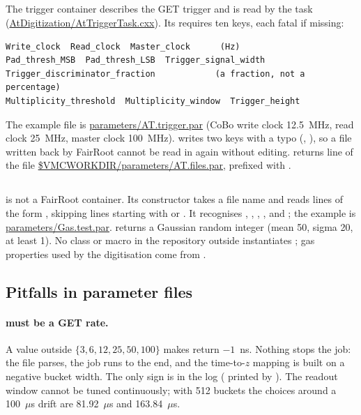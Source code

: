 \subsection{}

The trigger container  describes the GET trigger and is read by the task
 (\url{AtDigitization/AtTriggerTask.cxx}). Its  requires ten
 keys, each fatal if missing:
\begin{verbatim}
Write_clock  Read_clock  Master_clock      (Hz)
Pad_thresh_MSB  Pad_thresh_LSB  Trigger_signal_width
Trigger_discriminator_fraction            (a fraction, not a percentage)
Multiplicity_threshold  Multiplicity_window  Trigger_height
\end{verbatim}
The example file is
\url{parameters/AT.trigger.par} (CoBo write clock 12.5~MHz, read clock 25~MHz, master clock 100~MHz).
 writes two keys with a typo (,
), so a file written back by FairRoot cannot be read in again without
editing.  returns line  of the file
\url{$VMCWORKDIR/parameters/AT.files.par}, prefixed with .

\subsection{}

 is not a FairRoot container. Its constructor takes a file name and reads lines of the form
, skipping lines starting with \code{\#} or \code{[}. It recognises
, , , ,
 and ; the example is \url{parameters/Gas.test.par}.
 returns a Gaussian random integer (mean 50, sigma 20, at least 1). No class or
macro in the repository outside  instantiates ; gas properties used by
the digitisation come from .

\subsection{Pitfalls in parameter files}
\label{sec:par-pitfalls}

\paragraph{ must be a GET rate.} A value outside $\{3,6,12,25,50,100\}$ makes
 return $-1$~ns. Nothing stops the job: the file parses, the job runs to the end, and
the time-to-$z$ mapping is built on a negative bucket width. The only sign is in the log
( printed by ). The readout window cannot be tuned
continuously; with 512 buckets the choices around a 100~$\mu$s drift are 81.92~$\mu$s and
163.84~$\mu$s.

